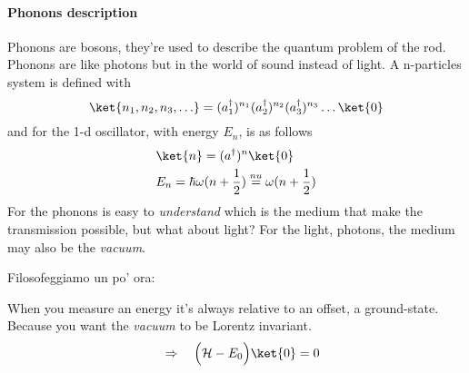 \documentclass[class=article]{standalone}
\begin{document}
\paragraph{Phonons description} Phonons are bosons, they're used to describe the quantum problem of the rod. Phonons are like photons but in the world of sound instead of light.
A n-particles system is defined with 
\begin{equation*}
\ket{n_1, n_2, n_3, \ldots } = (a_1^{\dagger})^{n_1}  (a_2^{\dagger})^{n_2}  (a_3^{\dagger})^{n_3} \ldots \ket{0}
\end{equation*}
and for the 1-d oscillator, with energy $E_n$, is as follows
\begin{equation*}
\begin{split}
& \ket{n} =  (a^{\dagger})^{n} \ket{0} \\
& E_n = \hbar \omega (n + \frac{1}{2}) \stackrel{nu}{=} \omega (n + \frac{1}{2}) 
\end{split}
\end{equation*}
For the phonons is easy to \emph{understand} which is the medium that make the transmission possible, but what about light?
For the light, photons, the medium may also be the \emph{vacuum}.

\begin{center}
Filosofeggiamo un po' ora:
\end{center}

When you measure an energy it's always relative to an offset, a ground-state.
Because you want the \emph{vacuum} to be Lorentz invariant.
\begin{equation*}
\quad\Rightarrow\quad 
\Big( \mathcal{H} - E_0 \Big) \ket{0} = 0
\end{equation*}
\end{document}
